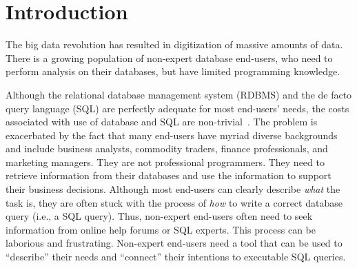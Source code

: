 \section{Introduction}
\label{sec:introduction}

\vspace{-1mm}

The big data revolution has resulted in digitization of massive amounts
of data. There is a growing population
of non-expert database end-users, who need to perform
analysis on their databases, but have limited programming knowledge.





Although the relational database management system (RDBMS) and the
de facto query language (SQL) are perfectly adequate for most end-users'
needs, 
the costs associated with use of database and SQL are non-trivial~\cite{Howe:2011}. 
The problem is exacerbated by the fact that many end-users
have myriad diverse backgrounds and include
business analysts, commodity traders, 
finance professionals, and marketing managers. 
They are not professional programmers.
They need to retrieve information from their
databases and use the information to support their business decisions.
Although most end-users can clearly describe \textit{what} the task is, they
are often stuck with the process of \textit{how} to
write a correct database query (i.e., a SQL query).
Thus, non-expert end-users often need to
seek information from online help forums or
SQL experts. This process can be laborious and frustrating.
Non-expert end-users need
a tool that can be used to ``describe''
their needs and ``connect'' their intentions to executable
SQL queries.


